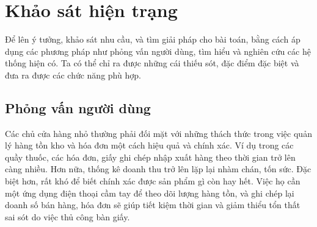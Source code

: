 \documentclass[../DoAn.tex]{subfiles}
\begin{document}





\section{Khảo sát hiện trạng}
\label{section:2.1}
Để lên ý tưởng, khảo sát nhu cầu, và tìm giải pháp cho bài toán, bằng cách áp dụng các phương pháp như phỏng vấn người dùng, tìm hiểu và nghiên cứu các hệ thống hiện có. Ta có thể chỉ ra được những cái thiếu sót, đặc điểm đặc biệt và đưa ra được các chức năng phù hợp.

\subsection{Phỏng vấn người dùng}
\label{section:2.1.1}
Các chủ cửa hàng nhỏ thường phải đối mặt với những thách thức trong việc quản lý hàng tồn kho và hóa đơn một cách hiệu quả và chính xác. Ví dụ trong các quầy thuốc, các hóa đơn, giấy ghi chép nhập xuất hàng theo thời gian trở lên càng nhiều. Hơn nữa, thống kê doanh thu trở lên lặp lại nhàm chán, tốn sức. Đặc biệt hơn, rất khó để biết chính xác được sản phẩm gì còn hay hết. Việc họ cần một ứng dụng điện thoại cầm tay để theo dõi lượng hàng tồn, và ghi chép lại doanh số bán hàng, hóa đơn sẽ giúp tiết kiệm thời gian và giảm thiểu tổn thất sai sót do việc thủ công bàn giấy.
\end{document}

